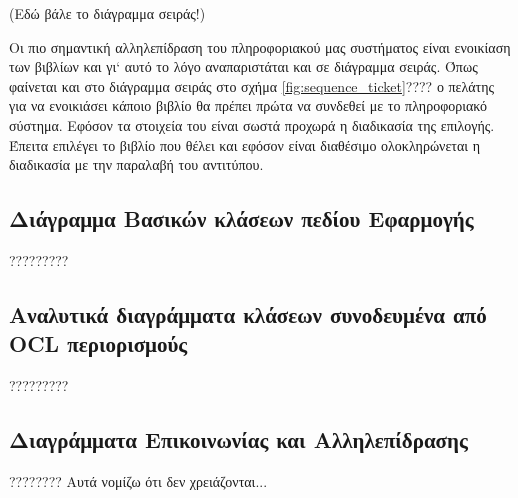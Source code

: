 \documentclass{assignment}
\begin{document}
(Εδώ βάλε το διάγραμμα σειράς!)

Οι πιο σημαντική αλληλεπίδραση του πληροφοριακού μας συστήματος είναι ενοικίαση των βιβλίων και γι` αυτό το λόγο αναπαριστάται και σε διάγραμμα σειράς. Όπως φαίνεται και στο διάγραμμα σειράς στο σχήμα \ref{fig:sequence_ticket}???? ο πελάτης για να ενοικιάσει  κάποιο βιβλίο θα πρέπει πρώτα να συνδεθεί με το πληροφοριακό σύστημα. Εφόσον τα στοιχεία του είναι σωστά προχωρά η διαδικασία της επιλογής. Έπειτα επιλέγει το βιβλίο που θέλει και εφόσον είναι διαθέσιμο  ολοκληρώνεται η διαδικασία με την παραλαβή του αντιτύπου.


\subsection{Διάγραμμα Βασικών κλάσεων πεδίου Εφαρμογής}?????????



\subsection{Αναλυτικά διαγράμματα κλάσεων συνοδευμένα από OCL περιορισμούς}?????????

\subsection{Διαγράμματα Επικοινωνίας και Αλληλεπίδρασης}???????? Αυτά νομίζω ότι δεν χρειάζονται...




\end{document}
